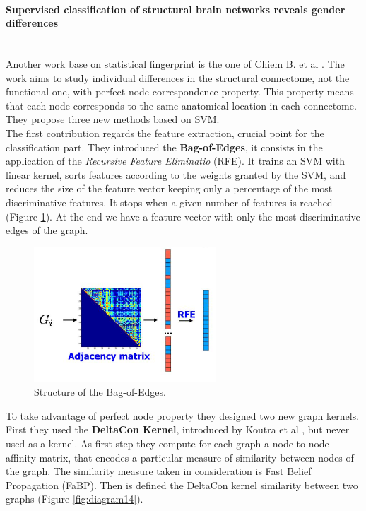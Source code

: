 \paragraph{Supervised classification of structural brain networks reveals gender differences}\
\\

Another work base on statistical fingerprint is the one of Chiem B. et al \cite{8379106}. The work aims to study individual differences in the structural connectome, not the functional one, with perfect node correspondence property. This property means that each node corresponds to the same anatomical location in each connectome. They propose three new methods based on SVM.
\\

The first contribution regards the feature extraction, crucial point for the classification part. They introduced the \textbf{Bag-of-Edges}, it consists in the application of the \textit{Recursive Feature Eliminatio} (RFE). It trains an SVM with linear kernel, sorts features according to the weights granted by the SVM, and reduces the size of the feature vector keeping only a percentage of the most discriminative features. It stops when a given number of features is reached (Figure \ref{fig:diagram13}). At the end we have a feature vector with only the most discriminative edges of the graph.

\begin{figure}[htbp]
	\centering
	\includegraphics[scale=0.8]{Immagini/supervised1.PNG}
	\caption{Structure of the Bag-of-Edges.}
	\label{fig:diagram13}
\end{figure}
 
To take advantage of perfect node property they designed two new graph kernels. First they used the \textbf{DeltaCon Kernel}, introduced by Koutra et al \cite{koutra2013deltacon}, but never used as a kernel. As first step they compute for each graph a node-to-node affinity matrix, that encodes a particular measure of similarity between nodes of the graph. The similarity measure taken in consideration is Fast Belief Propagation (FaBP). Then is defined the DeltaCon kernel similarity between two graphs (Figure \ref{fig:diagram14}). 

